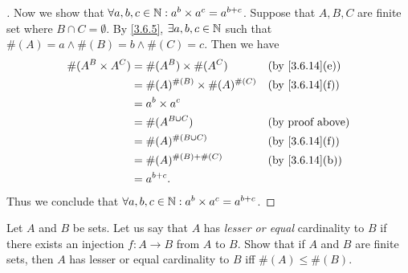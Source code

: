 \begin{proof}[]
	Now we show that \(\forall a, b, c \in \mathbb{N} : a^b \times a^c = a^{b + c}\).
	Suppose that \(A, B, C\) are finite set where \(B \cap C = \emptyset\).
	By \cref{3.6.5}, \(\exists a, b, c \in \mathbb{N}\) such that \(\#(A) = a \land \#(B) = b \land \#(C) = c\).
	Then we have
	\begin{align*}
		\#(A^B \times A^C) & = \#(A^B) \times \#(A^C)             &  & \text{(by \cref{3.6.14}(e))} \\
		                   & = \#(A)^{\#(B)} \times \#(A)^{\#(C)} &  & \text{(by \cref{3.6.14}(f))} \\
		                   & = a^b \times a^c                                                       \\
		                   & = \#(A^{B \cup C})                   &  & \text{(by proof above)}      \\
		                   & = \#(A)^{\#(B \cup C)}               &  & \text{(by \cref{3.6.14}(f))} \\
		                   & = \#(A)^{\#(B) + \#(C)}              &  & \text{(by \cref{3.6.14}(b))} \\
		                   & = a^{b + c}.
	\end{align*}
	Thus we conclude that \(\forall a, b, c \in \mathbb{N} : a^b \times a^c = a^{b + c}\).
\end{proof}

\begin{ex}\label{ex:3.6.7}
	Let \(A\) and \(B\) be sets.
	Let us say that \(A\) has \emph{lesser or equal} cardinality to \(B\) if there exists an injection \(f : A \to B\) from \(A\) to \(B\).
	Show that if \(A\) and \(B\) are finite sets, then \(A\) has lesser or equal cardinality to \(B\) iff \(\#(A) \leq \#(B)\).
\end{ex}

